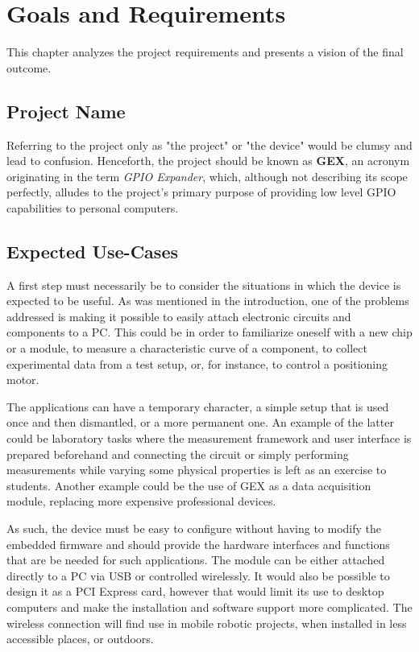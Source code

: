 \chapter{Goals and Requirements}

This chapter analyzes the project requirements and presents a vision of the final outcome.

\section{Project Name}

Referring to the project only as "the project" or "the device" would be clumsy and lead to confusion. Henceforth, the project should be known as \textbf{GEX}, an acronym originating in the term \textit{GPIO Expander}, which, although not describing its scope perfectly, alludes to the project's primary purpose of providing low level GPIO capabilities to personal computers.

\section{Expected Use-Cases}

A first step must necessarily be to consider the situations in which the device is expected to be useful. As was mentioned in the introduction, one of the problems addressed is making it possible to easily attach electronic circuits and components to a PC. This could be in order to familiarize oneself with a new chip or a module, to measure a characteristic curve of a component, to collect experimental data from a test setup, or, for instance, to control a positioning motor.

The applications can have a temporary character, a simple setup that is used once and then dismantled, or a more permanent one. An example of the latter could be laboratory tasks where the measurement framework and user interface is prepared beforehand and connecting the circuit or simply performing measurements while varying some physical properties is left as an exercise to students. Another example could be the use of GEX as a data acquisition module, replacing more expensive professional devices.

As such, the device must be easy to configure without having to modify the embedded firmware and should provide the hardware interfaces and functions that are be needed for such applications. The module can be either attached directly to a PC via USB or controlled wirelessly. It would also be possible to design it as a PCI Express card, however that would limit its use to desktop computers and make the installation and software support more complicated. The wireless connection will find use in mobile robotic projects, when installed in less accessible places, or outdoors.

